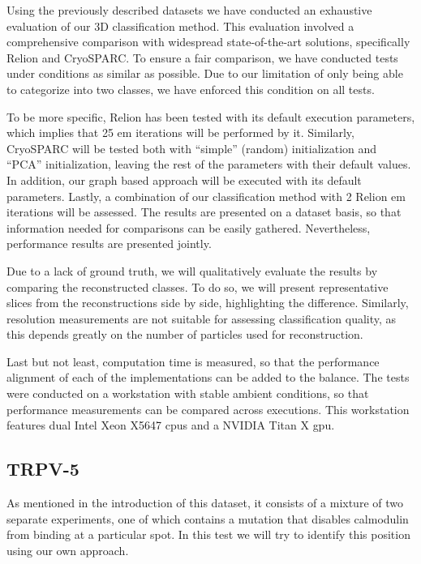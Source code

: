 \documentclass[../main.tex]{subfiles}
\begin{document}
Using the previously described datasets we have conducted an exhaustive evaluation of our 3D classification method. This evaluation involved a comprehensive comparison with widespread state-of-the-art solutions, specifically Relion\cite{scheres2021} and CryoSPARC\cite{cryosparc}. To ensure a fair comparison, we have conducted tests under conditions as similar as possible. Due to our limitation of only being able to categorize into two classes, we have enforced this condition on all tests.


To be more specific, Relion has been tested with its default execution parameters, which implies that 25 \gls{em} iterations will be performed by it. Similarly, CryoSPARC will be tested both with ``simple'' (random) initialization and ``PCA'' initialization, leaving the rest of the parameters with their default values. In addition, our graph based approach will be executed with its default parameters. Lastly, a combination of our classification method with 2 Relion \gls{em} iterations will be assessed. The results are presented on a dataset basis, so that information needed for comparisons can be easily gathered. Nevertheless, performance results are presented jointly.

Due to a lack of ground truth, we will qualitatively evaluate the results by comparing the reconstructed classes. To do so, we will present representative slices from the reconstructions side by side, highlighting the difference. Similarly, resolution measurements are not suitable for assessing classification quality, as this depends greatly on the number of particles used for reconstruction.

Last but not least, computation time is measured, so that the performance alignment of each of the implementations can be added to the balance. The tests were conducted on a workstation with stable ambient conditions, so that performance measurements can be compared across executions. This workstation features dual Intel Xeon X5647 \glspl{cpu} and a NVIDIA Titan X \gls{gpu}.

\subsection{TRPV-5}
As mentioned in the introduction of this dataset, it consists of a mixture of two separate experiments, one of which contains a mutation that disables calmodulin from binding at a particular spot. In this test we will try to identify this position using our own approach.
\end{document}
